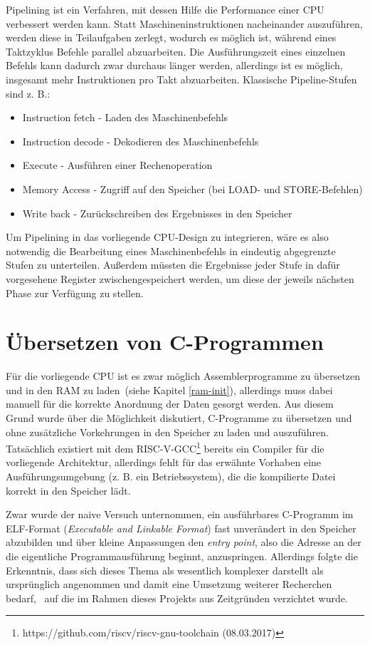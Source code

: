 Pipelining ist ein Verfahren, mit dessen Hilfe die Performance einer CPU verbessert werden kann.
Statt Maschineninstruktionen nacheinander auszuführen, werden diese in Teilaufgaben zerlegt, wodurch es möglich ist, während eines Taktzyklus Befehle parallel abzuarbeiten.
Die Ausführungszeit eines einzelnen Befehls kann dadurch zwar durchaus länger werden, allerdings ist es möglich, insgesamt mehr Instruktionen pro Takt abzuarbeiten.
Klassische Pipeline-Stufen sind z. B.:
\begin{itemize}
    \item Instruction fetch - Laden des Maschinenbefehls
    \item Instruction decode - Dekodieren des Maschinenbefehls
    \item Execute - Ausführen einer Rechenoperation
    \item Memory Access - Zugriff auf den Speicher (bei LOAD- und STORE-Befehlen)
    \item Write back - Zurückschreiben des Ergebnisses in den Speicher
\end{itemize}

Um Pipelining in das vorliegende CPU-Design zu integrieren, wäre es also notwendig die Bearbeitung eines Maschinenbefehls in eindeutig abgegrenzte Stufen zu unterteilen. 
Außerdem müssten die Ergebnisse jeder Stufe in dafür vorgesehene Register zwischengespeichert werden, um diese der jeweils nächsten Phase zur Verfügung zu stellen.

\section{Übersetzen von C-Programmen}
Für die vorliegende CPU ist es zwar möglich Assemblerprogramme zu übersetzen und in den RAM zu laden~(siehe Kapitel \ref{ram-init}), allerdings muss dabei manuell für die korrekte Anordnung der Daten gesorgt werden.
Aus diesem Grund wurde über die Möglichkeit diskutiert, C-Programme zu übersetzen und ohne zusätzliche Vorkehrungen in den Speicher zu laden und auszuführen.
Tatsächlich existiert mit dem RISC-V-GCC\footnote{https://github.com/riscv/riscv-gnu-toolchain (08.03.2017)} bereits ein Compiler für die vorliegende Architektur, allerdings fehlt für das erwähnte Vorhaben eine Ausführungsumgebung (z. B. ein Betriebssystem), die die kompilierte Datei korrekt in den Speicher lädt.

Zwar wurde der naive Versuch unternommen, ein ausführbares C-Programm im ELF-Format (\textit{Executable and Linkable Format}) fast unverändert in den Speicher abzubilden und über kleine Anpassungen den \textit{entry point}, also die Adresse an der die eigentliche Programmausführung beginnt, anzuspringen.
Allerdings folgte die Erkenntnis, dass sich dieses Thema als wesentlich komplexer darstellt als ursprünglich angenommen und damit eine Umsetzung weiterer Recherchen bedarf,~\cite[S. 9 ff.]{elf} auf die im Rahmen dieses Projekts aus Zeitgründen verzichtet wurde.


